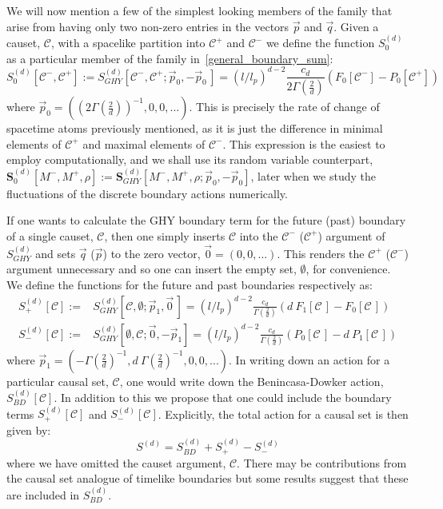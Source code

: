 \documentclass[12pt]{article}
\newcommand{\be}{\begin{equation}}
\newcommand{\ee}{\end{equation}}
\newcommand{\F}[1]{F_{#1}}
\renewcommand{\P}[1]{P_{#1}}
\begin{document}
We will now mention a few of the simplest looking members of the family that arise from having only two non-zero entries in the vectors $\vec{p}$ and $\vec{q}$. Given a causet, $\mathcal{C}$, with a spacelike partition into $\mathcal C^+$ and $\mathcal C^-$ we define the function $S^{ (d)}_0$ as a particular member of the family in~\eqref{general_boundary_sum}:
\be\label{eq:min_max_simple_formula}
S^{ (d)}_{0}\left[\mathcal{C}^-,\mathcal{C}^+\right]:=S^{ (d)}_{GHY}\left[\mathcal{C}^-,\mathcal{C}^+;\vec{p}_0, -\vec{p}_0\,\right]=\left (l/l_p\right)^{d-2}\frac{c_{d}}{2\Gamma\left (\frac{2}{d} \right)}\left ( \F{0}\left[\mathcal{C}^- \right] - \P{0}\left[\mathcal{C}^+ \right] \right)
\ee
where $\vec{p}_0=\left (\left (2\Gamma\left (\frac{2}{d} \right)\right)^{-1},0,0,...\right)$. This is precisely the rate of change of spacetime atoms previously mentioned, as it is just the difference in minimal elements of $\mathcal{C}^+$ and maximal elements of $\mathcal{C}^-$. This expression is the easiest to employ computationally, and we shall use its random variable counterpart, $\textbf{S}^{ (d)}_{0}\left[M^-,M^+,\rho\right]:=\textbf{S}^{ (d)}_{GHY}\left[M^-,M^+,\rho;\vec{p}_0, -\vec{p}_0\right]$, later when we study the fluctuations of the discrete boundary actions numerically.

If one wants to calculate the GHY boundary term for the future (past) boundary of a single causet, $\mathcal{C}$, then one simply inserts $\mathcal{C}$ into the $\mathcal{C}^-$ ($\mathcal{C}^+$) argument of $S^{ (d)}_{GHY}$ and sets $\vec{q}$ ($\vec{p}$) to the zero vector, $\vec{0}= (0,0,...)$. This renders the $\mathcal{C}^+$ ($\mathcal{C}^-$) argument unnecessary and so one can insert the empty set, $\emptyset$, for convenience. We define the functions for the future and past boundaries respectively as:
\begin{align}\label{eq:future_past_boundary_terms1}
S^{ (d)}_{+}[\mathcal{C}]:= & S^{ (d)}_{GHY}\left[\mathcal{C},\emptyset;\vec{p}_1,\vec{0}\,\right] =\left (l/l_p\right)^{d-2}\frac{c_{d}}{\Gamma\left (\frac{2}{d} \right)}\left ( d\:\F{1}\left[\mathcal{C}\,\right] - \F{0}\left[\mathcal{C}\,\right] \right)
\\
\label{eq:future_past_boundary_terms2}
S^{ (d)}_{-}[\mathcal{C}]:= & S^{ (d)}_{GHY}\left[\emptyset,\mathcal{C};\vec{0},-\vec{p}_1\right] =\left (l/l_p\right)^{d-2}\frac{c_{d}}{\Gamma\left (\frac{2}{d} \right)}\left ( \P{0}\left[\mathcal{C}\,\right] - d\: \P{1}\left[\mathcal{C}\,\right] \right)
\end{align}
where $\vec{p}_1=\left (-\Gamma\left (\frac{2}{d} \right)^{-1},d\:\Gamma\left (\frac{2}{d} \right)^{-1},0,0,...\right)$. In writing down an action for a particular causal set, $\mathcal{C}$, one would write down the Benincasa-Dowker action, $S^{ (d)}_{BD}[\mathcal{C}]$. In addition to this we propose that one could include the boundary terms $S^{ (d)}_{+}[\mathcal{C}]$ and $S^{ (d)}_{-}[\mathcal{C}]$. Explicitly, the total action for a causal set is then given by:
\be\label{eq:total_causet_action}
S^{ (d)}=S^{ (d)}_{BD}+S^{ (d)}_{+}-S^{ (d)}_{-}
\ee
where we have omitted the causet argument, $\mathcal{C}$. There may be contributions from the causal set analogue of timelike boundaries but some results suggest that these are included in $S^{ (d)}_{BD}$.
\end{document}
